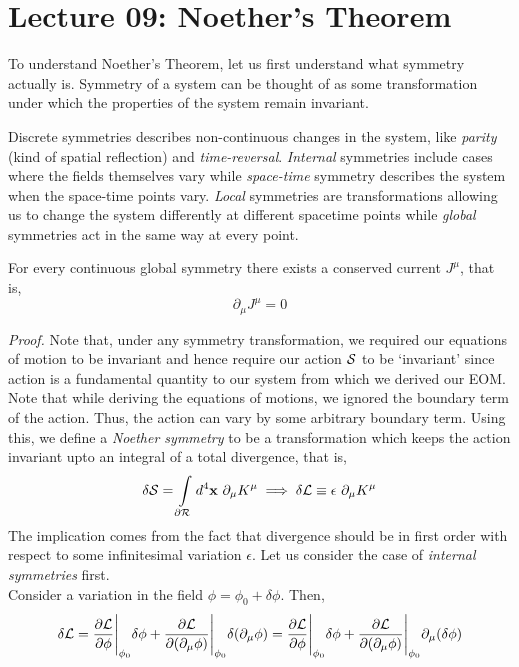 \section*{Lecture 09: Noether's Theorem}
To understand Noether's Theorem, let us first understand what symmetry actually is. Symmetry of a system can be thought of as some transformation under which the properties of the system remain invariant. 
\noindent
\begin{figure}[H]
    \centering 
    
\end{figure}
\noindent
Discrete symmetries describes non-continuous changes in the system, like \textit{parity}  (kind of spatial reflection) and \textit{time-reversal}. \textit{Internal} symmetries include cases where the fields themselves vary while \textit{space-time} symmetry describes the system when the space-time points vary. \textit{Local} symmetries are transformations allowing us to change the system differently at different spacetime points while \textit{global} symmetries act in the same way at every point.
\begin{theorem}
    For every continuous global symmetry there exists a conserved current $J^\mu$, that is,
    $$\partial_\mu J^\mu = 0$$
\end{theorem}
\textit{Proof.}
Note that, under any symmetry transformation, we required our equations of motion to be invariant and hence require our action $\mathcal S$ to be `invariant' since action is a fundamental quantity to our system from which we derived our EOM. Note that while deriving the equations of motions, we ignored the boundary term of the action. Thus, the action can vary by some arbitrary boundary term. Using this, we define a \textit{Noether symmetry} to be a transformation which keeps the action invariant upto an integral of a total divergence, that is,
$$\delta\mathcal S = \int\limits_{\partial\mathcal R} d^4\vb{x} \ \partial_\mu  K^\mu\implies \delta\mathcal L \equiv \epsilon\  \partial_\mu K^\mu$$ The implication comes from the fact that divergence should be in first order with respect to some infinitesimal variation $\epsilon$. Let us consider the case of \textit{internal symmetries} first.\\[0.2cm]
Consider a variation in the field $\phi = \phi_0+\delta \phi$. Then, 
$$\delta\mathcal L = \pdv{\mathcal L}{\phi}\Bigg|_{\phi_0}\delta\phi+\pdv{\mathcal L}{(\partial_\mu\phi)}\Bigg|_{\phi_0}\delta(\partial_\mu\phi) =\pdv{\mathcal L}{\phi}\Bigg|_{\phi_0}\delta\phi+\pdv{\mathcal L}{(\partial_\mu\phi)}\Bigg|_{\phi_0}\partial_\mu(\delta\phi)$$

